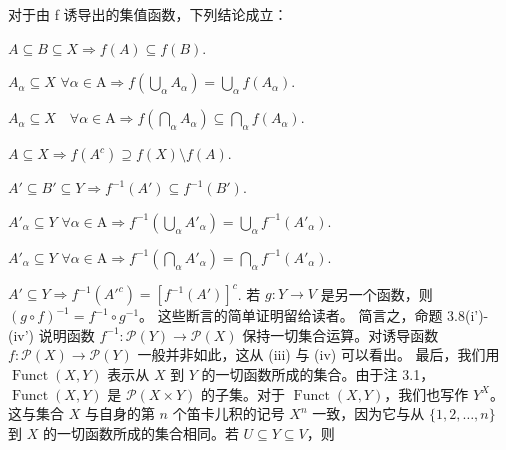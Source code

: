 \begin{proposition}

对于由 f 诱导出的集值函数，下列结论成立：

\begin{subitems}
\item

$ A \subseteq B \subseteq X \Rightarrow f(A) \subseteq f(B) $.

\item

$ A_\alpha \subseteq X $  $ \forall \alpha \in \mathrm{A} \Rightarrow f\left(\bigcup_\alpha A_\alpha\right) = \bigcup_\alpha f(A_\alpha) $.

\item

$ A_\alpha \subseteq X \quad \forall \alpha \in \mathrm{A} \Rightarrow f\left(\bigcap_\alpha A_\alpha\right) \subseteq \bigcap_\alpha f(A_\alpha) $.

\item

$ A \subseteq X \Rightarrow f(A^c) \supseteq f(X) \setminus f(A) $.

\end{subitems}

\begin{subitems}
\item[（i′）]

$ A' \subseteq B' \subseteq Y \Rightarrow f^{-1}(A') \subseteq f^{-1}(B') $.

\item[（ii′）]

$ A'_\alpha \subseteq Y $  $ \forall \alpha \in \mathrm{A} \Rightarrow f^{-1}\left(\bigcup_\alpha A'_\alpha\right) = \bigcup_\alpha f^{-1}(A'_\alpha) $.

\item[（iii′）]

$ A'_\alpha \subseteq Y $  $ \forall \alpha \in \mathrm{A} \Rightarrow f^{-1}\left(\bigcap_\alpha A'_\alpha\right) = \bigcap_\alpha f^{-1}(A'_\alpha) $.

\item[（iv′）]

$ A' \subseteq Y \Rightarrow f^{-1}(A'^c) = [f^{-1}(A')]^c $.
若 $ g: Y \to V $ 是另一个函数，则 $ (g \circ f)^{-1} = f^{-1} \circ g^{-1} $。
这些断言的简单证明留给读者。
简言之，命题 3.8(i')-(iv') 说明函数 $ f^{-1} : \mathcal{P}(Y) \to \mathcal{P}(X) $ 保持一切集合运算。对诱导函数 $ f : \mathcal{P}(X) \to \mathcal{P}(Y) $ 一般并非如此，这从 (iii) 与 (iv) 可以看出。
最后，我们用 $\operatorname{Funct}(X,Y)$ 表示从 $X$ 到 $Y$ 的一切函数所成的集合。由于注 3.1，$\operatorname{Funct}(X,Y)$ 是 $\mathcal{P}(X\times Y)$ 的子集。对于 $\operatorname{Funct}(X,Y)$，我们也写作 $Y^X$。这与集合 $X$ 与自身的第 $n$ 个笛卡儿积的记号 $X^n$ 一致，因为它与从 $\{1,2,\ldots,n\}$ 到 $X$ 的一切函数所成的集合相同。若 $U\subseteq Y\subseteq V$，则


\end{subitems}
\end{proposition}
